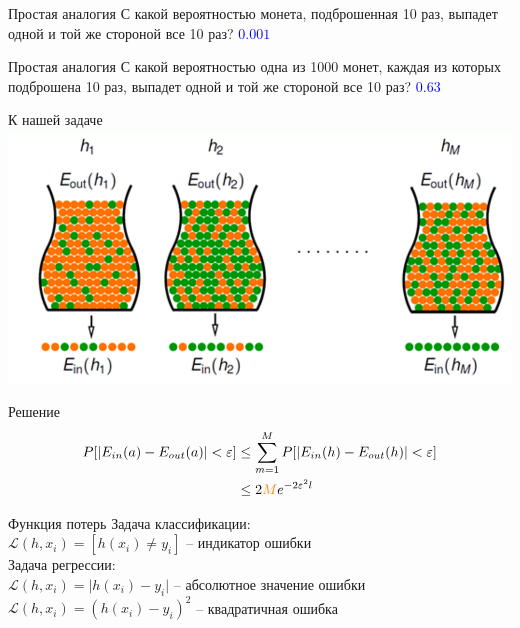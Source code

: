 \documentclass[10pt]{beamer}
\begin{document}
\begin{frame}{Простая аналогия}
  \centering
  С какой вероятностью монета, подброшенная 10 раз, выпадет одной и той же стороной все 10 раз?
  \pause
  \bigbreak
  \textcolor{blue}{$0.001$}
\end{frame}

\begin{frame}{Простая аналогия}
  \centering
  С какой вероятностью одна из 1000 монет, каждая из которых подброшена 10 раз, выпадет одной и той же стороной все 10 раз?
  \pause
  \bigbreak
  \textcolor{blue}{$0.63$}
\end{frame}

\begin{frame} {К нашей задаче}
  \includegraphics[width=\textwidth, keepaspectratio]{images/bins}
\end{frame}

\begin{frame} {Решение}
  \begin{align*}
    P[\vert E_{in}(a) - E_{out}(a) \vert < \varepsilon ] &\leq \sum\limits_{m=1}^M P[\vert E_{in}(h) - E_{out}(h) \vert < \varepsilon ] \\
    & \leq 2\textcolor{orange}{M} e^{-2 \varepsilon^2 l} 
  \end{align*}
\end{frame}


{
\begin{frame}{Функция потерь}
  Задача классификации:\\
  $\mathcal{L}(h, x_i) = [h(x_i) \neq y_i]$ -- индикатор ошибки\\
  \bigbreak
  Задача регрессии:\\
  $\mathcal{L}(h, x_i) = \vert h(x_i) - y_i \vert$ -- абсолютное значение ошибки\\
  $\mathcal{L}(h, x_i) = (h(x_i) - y_i)^2$ -- квадратичная ошибка\\
\end{frame}
}
\end{document}
